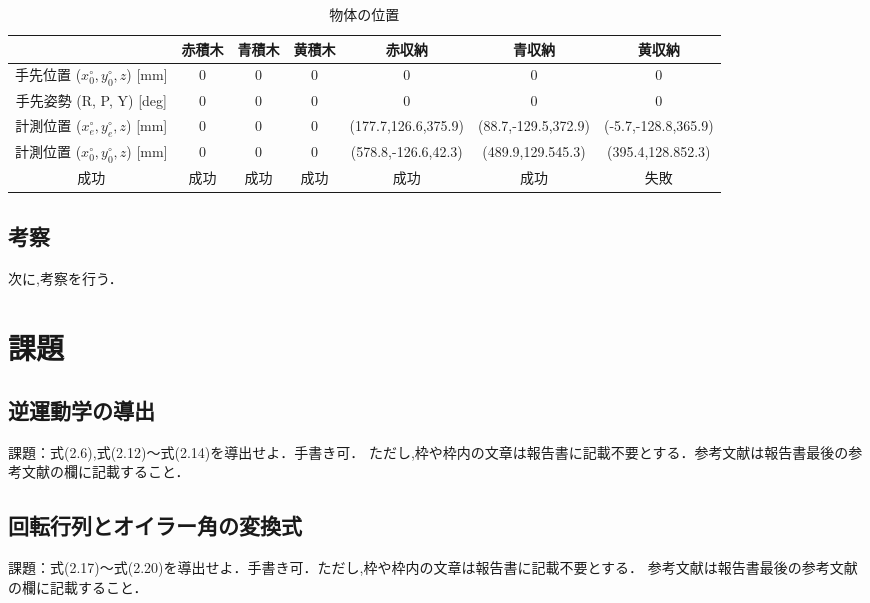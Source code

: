 \begin{table}[h]
  \centering
  \caption{物体の位置}
  \begin{tabular}{|c|c|c|c|c|c|c|}
    \hline
                                                      & 赤積木 & 青積木 & 黄積木 & 赤収納              & 青収納              & 黄収納              \\ \hline
    \hline
    手先位置 ($x_{0}^{\circ}, y_{0}^{\circ}, z$) [mm] & 0      & 0      & 0      & 0                   & 0                   & 0                   \\ \hline
    手先姿勢 (R, P, Y) [deg]                          & 0      & 0      & 0      & 0                   & 0                   & 0                   \\ \hline
    計測位置 ($x_{e}^{\circ}, y_{e}^{\circ}, z$) [mm] & 0      & 0      & 0      & (177.7,126.6,375.9) & (88.7,-129.5,372.9) & (-5.7,-128.8,365.9) \\ \hline
    計測位置 ($x_{0}^{\circ}, y_{0}^{\circ}, z$) [mm] & 0      & 0      & 0      & (578.8,-126.6,42.3) & (489.9,129.545.3)   & (395.4,128.852.3)   \\ \hline
    成功                                              & 成功   & 成功   & 成功   & 成功                & 成功                & 失敗                \\ \hline 
    
  \end{tabular}
\end{table}

\subsection{考察}
次に,考察を行う．


\section{課題}

\subsection{逆運動学の導出}
課題：式(2.6),式(2.12)～式(2.14)を導出せよ．手書き可．
ただし,枠や枠内の文章は報告書に記載不要とする．参考文献は報告書最後の参考文献の欄に記載すること．

\subsection{回転行列とオイラー角の変換式}
課題：式(2.17)～式(2.20)を導出せよ．手書き可．ただし,枠や枠内の文章は報告書に記載不要とする．
参考文献は報告書最後の参考文献の欄に記載すること．

